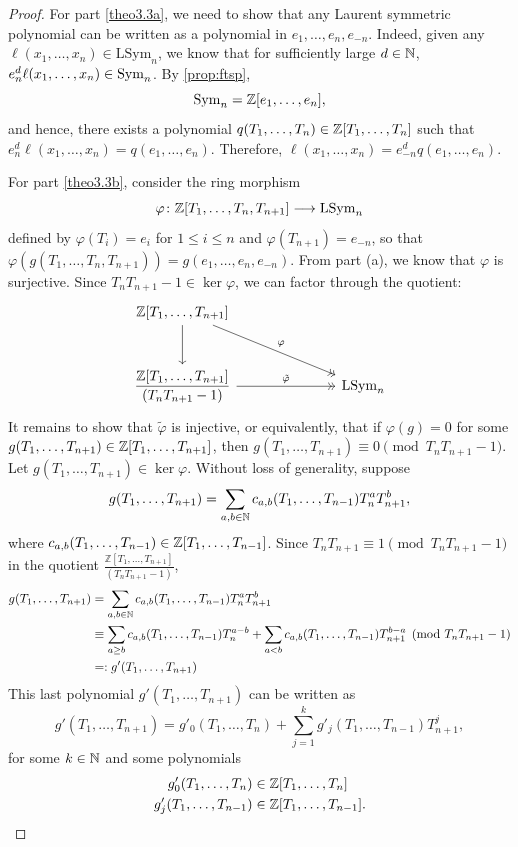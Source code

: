\documentclass[11pt]{amsart}
\begin{document}
\begin{proof}
     For part \cref{theo3.3a},
     we need to show that any Laurent symmetric polynomial can be written as a polynomial in \(e_1,\dots,e_n,e_{-n}\). Indeed, given any \(\ell(x_1,\dots,x_n) \in \mathrm{LSym}_n\), we know that for sufficiently large \(d \in \mathbb{N}\), \(e_n^d \ell(x_1,\dots,x_n) \in \mathrm{Sym}_n\). By \cref{prop:ftsp}, 
     \[ \mathrm{Sym}_n=\mathbb{Z}[e_1,\dots,e_n],\] 
     and hence, there exists a polynomial $q(T_1,\dots,T_n) \in \mathbb{Z}[T_1,\dots,T_n]$ such that \(e_n^d \ell (x_1,\dots,x_n) = q(e_1,\dots,e_n)\).
     Therefore, \(\ell(x_1,\dots,x_n) = e_{-n}^d q(e_1,\dots,e_n)\).

     For part \cref{theo3.3b}, consider the ring morphism
     \[
     \varphi \colon \mathbb{Z} [T_1,\dots,T_n, T_{n + 1}] \longrightarrow \mathrm{LSym}_n
     \]
     defined by \(\varphi(T_i) = e_i\) for \(1 \leq i \leq n\) and \(\varphi (T_{n + 1}) = e_{-n}\), so that \(\varphi(g(T_1,\dots,T_{n},T_{n + 1})) = g(e_1,\dots,e_n, e_{-n})\). From part (a), we know that $\varphi$ is surjective. Since \(T_n T_{n + 1} - 1 \in \ker \varphi\), we can factor through the quotient:
     \begin{equation}
          \begin{tikzcd}[row sep=1cm, column sep=2.5cm,arrow style=tikz]
    \mathbb{Z}[T_1, \dots, T_{n+1}] \arrow[d] \arrow[dr,twoheadrightarrow, "\varphi"] & \\
    \displaystyle\frac{\mathbb{Z}[T_1, \dots, T_{n+1}]}{(T_n T_{n+1} - 1)} \arrow[r, twoheadrightarrow, "\tilde{\varphi}"] & \LSym_n
    \end{tikzcd} \label{eq:phiphitilde}
     \end{equation}
    It remains to show that \(\tilde{\varphi}\) is injective, or equivalently, that if \(\varphi(g) = 0\) for some \(g(T_1,\dots,T_{n + 1}) \in \mathbb{Z}[T_1,\dots,T_{n + 1}]\), then \(g(T_1,\dots,T_{n + 1}) \equiv 0 \pmod{T_n T_{n + 1} - 1}\). Let \(g(T_1,\dots,T_{n + 1}) \in \ker \varphi\). Without loss of generality, suppose
    \[
        g(T_1,\dotsc,T_{n+1}) = \sum_{a,b \in \mathbb{N}} c_{a,b}(T_1,\dotsc,T_{n-1}) T_n^a T_{n+1}^b,
    \]
    where $c_{a,b}(T_1,\dotsc,T_{n-1})\in \mathbb{Z}[T_1,\dotsc,T_{n-1}]$. Since \(T_n T_{n + 1} \equiv 1 \pmod{T_nT_{n + 1} - 1}\) in the quotient $\frac{\mathbb{Z}[T_1, \dots, T_{n+1}]}{(T_n T_{n+1} - 1)}$, 
    \begin{align*}
        g(T_1,\dotsc,T_{n+1}) & = \sum_{a,b \in \mathbb{N}} c_{a,b}(T_1,\dotsc,T_{n-1}) T_n^a T_{n+1}^b \\
        &\equiv \sum_{a \geq b} c_{a,b}(T_1, \dots, T_{n-1})T_n^{a - b} + \sum_{a < b} c_{a,b}(T_1, \dots, T_{n-1})T_{n+1}^{b - a}  \pmod{T_n T_{n + 1} - 1} \\
        &=: g'(T_1,\dots,T_{n+1}) 
    \end{align*}
This last polynomial \(g'(T_1,\dots,T_{n + 1})\) can be written as
 \[
 g'(T_1,\dots,T_{n+1}) = g'_0 (T_1,\dots,T_n) + \sum_{j = 1}^k g'_j(T_1,\dots,T_{n - 1})T_{n +1}^j,
 \]
 for some \(k \in \mathbb{N}\) and some polynomials
 \begin{align*}
     g'_0(T_1,\dots,T_n) &\in \mathbb{Z}[T_1,\dots,T_n] \\
     g'_j(T_1,\dots,T_{n - 1}) &\in \mathbb{Z} [T_1,\dots,T_{n - 1}].
 \end{align*}
 

\end{proof}
\end{document}

